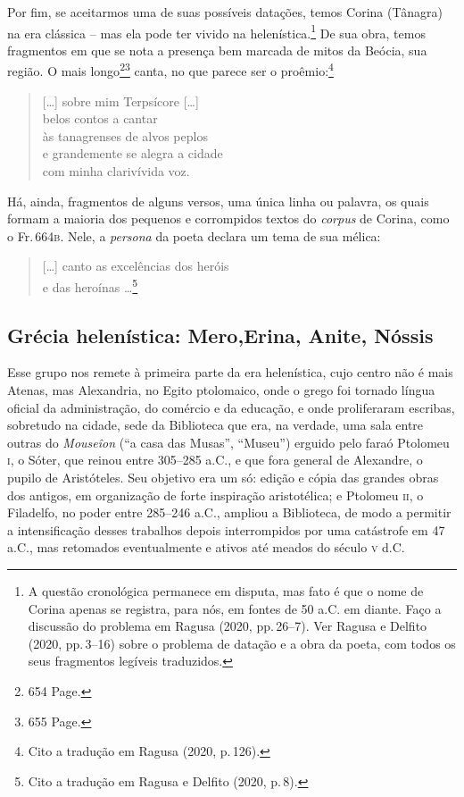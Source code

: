 Por fim, se aceitarmos uma de suas possíveis datações, temos Corina (Tânagra) na
era clássica -- mas ela pode ter vivido na helenística.\footnote{A questão cronológica permanece em disputa, mas fato é que o nome de Corina apenas se registra, para nós, em
fontes de 50 a.C. em diante. Faço a discussão do problema em Ragusa (2020, pp.\,26--7). Ver Ragusa e Delfito (2020, pp.\,3--16) sobre o problema de datação e a obra da poeta, com todos os seus fragmentos legíveis traduzidos.} De sua obra, temos
fragmentos em que se nota a presença bem marcada de mitos da Beócia, sua região.
O mais longo\footnote{654 Page.}\footnote{655 Page.}
canta, no que parece ser o proêmio:\footnote{Cito a tradução em Ragusa (2020, p.\,126).}

\begin{verse}
\small{{[}\ldots{}{]} sobre mim Terpsícore {[}\ldots{}{]}\\
belos contos a cantar\\
às tanagrenses de alvos peplos\\
e grandemente se alegra a cidade\\
com minha clarivívida voz.}
\end{verse}

Há, ainda, fragmentos de alguns versos, uma única linha ou palavra, os quais
formam a maioria dos pequenos e corrompidos textos do \textit{corpus} de
Corina, como o Fr.\,664\textsc{b}. Nele, a \textit{persona} da poeta declara um
tema de sua mélica:

\begin{verse}
\small{{[}\ldots{}{]} canto as excelências dos heróis\\
e das heroínas \ldots{}}\footnote{Cito a tradução em Ragusa e Delfito (2020, p.\,8).}
\end{verse}

\subsection*{Grécia helenística: Mero,\break Erina, Anite, Nóssis}

Esse grupo nos remete à primeira parte da era helenística, cujo centro não é
mais Atenas, mas Alexandria, no Egito ptolomaico, onde o grego foi tornado
língua oficial da administração, do comércio e da educação, e onde proliferaram
escribas, sobretudo na cidade, sede da Biblioteca que era, na
verdade, uma sala entre outras do \textit{Mouseîon} (“a casa das Musas”,
“Museu”) erguido pelo faraó Ptolomeu \textsc{i}, o Sóter, que reinou entre 305--285 a.C.,
e que fora general de Alexandre, o pupilo de Aristóteles. Seu objetivo era um
só: edição e cópia das grandes obras dos antigos, em organização de forte
inspiração aristotélica; e Ptolomeu \textsc{ii}, o Filadelfo, no poder entre 285--246
a.C., ampliou a Biblioteca, de modo a permitir a intensificação desses
trabalhos depois interrompidos por uma catástrofe em 47 a.C., mas retomados
eventualmente e ativos até meados do século \textsc{v} d.C. 

